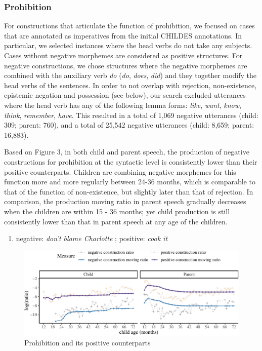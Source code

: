 \documentclass[
  english,
  man,floatsintext]{apa6}
\providecommand{\tightlist}{%
  \setlength{\itemsep}{0pt}\setlength{\parskip}{0pt}}
\begin{document}
\hypertarget{prohibition}{%
\subsubsection{Prohibition}\label{prohibition}}

For constructions that articulate the function of prohibition, we focused on cases that are annotated as imperatives from the initial CHILDES annotations. In particular, we selected instances where the head verbs do not take any subjects. Cases without negative morphemes are considered as positive structures. For negative constructions, we chose structures where the negative morphemes are combined with the auxiliary verb \emph{do} (\emph{do}, \emph{does}, \emph{did}) and they together modify the head verbs of the sentences. In order to not overlap with rejection, non-existence, epistemic negation and possession (see below), our search excluded utterances where the head verb has any of the following lemma forms: \emph{like}, \emph{want}, \emph{know}, \emph{think}, \emph{remember}, \emph{have}. This resulted in a total of 1,069 negative utterances (child: 309; parent: 760), and a total of 25,542 negative utterances (child: 8,659; parent: 16,883).

Based on Figure 3, in both child and parent speech, the production of negative constructions for prohibition at the syntactic level is consistently lower than their positive counterparts. Children are combining negative morphemes for this function more and more regularly between 24-36 months, which is comparable to that of the function of non-existence, but slightly later than that of rejection. In comparison, the production moving ratio in parent speech gradually decreases when the children are within 15 - 36 months; yet child production is still consistently lower than that in parent speech at any age of the children.

\begin{enumerate}
\def\labelenumi{(\arabic{enumi})}
\setcounter{enumi}{6}
\tightlist
\item
  negative: \emph{don't blame Charlotte} ; positive: \emph{cook it}
\end{enumerate}

\begin{figure}[H]

{\centering \includegraphics{neg_construction_article_files/figure-latex/prohibition-1} 

}

\caption{Prohibition and its positive counterparts}\label{fig:prohibition}
\end{figure}
\end{document}
